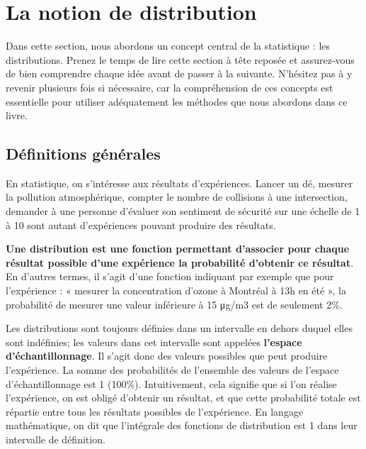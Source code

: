 \documentclass[
  11pt,
  french,
]{book}
\makeatletter
\newenvironment{kframev}{%
\medskip{}
\setlength{\fboxsep}{.8em}
 \def\at@end@of@kframev{}%
 \ifinner\ifhmode%
  \def\at@end@of@kframev{\end{minipage}}%
  \begin{minipage}{\columnwidth}%
 \fi\fi%
 \def\FrameCommand##1{\hskip\@totalleftmargin \hskip-\fboxsep
 \colorbox{shadebluecolor}{##1}\hskip-\fboxsep
     \hskip-\linewidth \hskip-\@totalleftmargin \hskip\columnwidth}%
 \MakeFramed {\advance\hsize-\width
   \@totalleftmargin\z@ \linewidth\hsize
   \@setminipage}}%
 {\par\unskip\endMakeFramed%
 \at@end@of@kframev}
\newenvironment{rmdblock}[1]
  {
  \begin{itemize}
  \renewcommand{\labelitemi}{
    \raisebox{-.7\height}[0pt][0pt]{
      {\setkeys{Gin}{width=3em,keepaspectratio}\texttt{[image: images/\#1]}}
    }
  }
  \setlength{\fboxsep}{1em}
  \begin{kframev}
  \small
  \item
  }
  {
  \end{kframev}
  \end{itemize}
  }
\newenvironment{bloc_objectif}
  {\begin{rmdblock}{objectif}}
  {\end{rmdblock}}
\makeatother
\begin{document}
\hypertarget{sect024}{%
\section{La notion de distribution}\label{sect024}}

\begin{bloc_objectif}
Dans cette section, nous abordons un concept central de la statistique : les distributions. Prenez le temps de lire cette section à tête reposée et assurez-vous de bien comprendre chaque idée avant de passer à la suivante. N'hésitez pas à y revenir plusieurs fois si nécessaire, car la compréhension de ces concepts est essentielle pour utiliser adéquatement les méthodes que nous abordons dans ce livre.

\end{bloc_objectif}

\hypertarget{duxe9finitions-guxe9nuxe9rales}{%
\subsection{Définitions générales}\label{duxe9finitions-guxe9nuxe9rales}}

En statistique, on s'intéresse aux résultats d'expériences. Lancer un dé, mesurer la pollution atmosphérique, compter le nombre de collisions à une intersection, demander à une personne d'évaluer son sentiment de sécurité sur une échelle de 1 à 10 sont autant d'expériences pouvant produire des résultats.

\textbf{Une distribution est une fonction permettant d'associer pour chaque résultat possible d'une expérience la probabilité d'obtenir ce résultat}. En d'autres termes, il s'agit d'une fonction indiquant par exemple que pour l'expérience : « mesurer la concentration d'ozone à Montréal à 13h en été », la probabilité de mesurer une valeur inférieure à 15 μg/m3 est de seulement 2\%.

Les distributions sont toujours définies dans un intervalle en dehors duquel elles sont indéfinies; les valeurs dans cet intervalle sont appelées \textbf{l'espace d'échantillonnage}. Il s'agit donc des valeurs possibles que peut produire l'expérience. La somme des probabilités de l'ensemble des valeurs de l'espace d'échantillonnage est 1 (100\%). Intuitivement, cela signifie que si l'on réalise l'expérience, on est obligé d'obtenir un résultat, et que cette probabilité totale est répartie entre tous les résultats possibles de l'expérience. En langage mathématique, on dit que l'intégrale des fonctions de distribution est 1 dans leur intervalle de définition.
\end{document}
